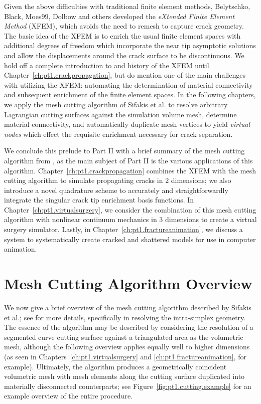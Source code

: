Given the above difficulties with traditional finite element methods, Belytschko, Black, Moes99, Dolbow \cite{Belytschko99, Moes99} and others developed the \emph{eXtended Finite Element Method} (XFEM), which avoids the need to remesh to capture crack geometry. The basic idea of the XFEM is to enrich the usual finite element spaces with additional degrees of freedom which incorporate the near tip asymptotic solutions and allow the displacements around the crack surface to be discontinuous. We hold off a complete introduction to and history of the XFEM until Chapter~\ref{ch:pt1.crackpropagation}, but do mention one of the main challenges with utilizing the XFEM: automating the determination of material connectivity and subsequent enrichment of the finite element spaces. In the following chapters, we apply the mesh cutting algorithm of Sifakis et al. \cite{Sifakis07} to resolve arbitrary Lagrangian cutting surfaces against the simulation volume mesh, determine material connectivity, and automatically duplicate mesh vertices to yield \emph{virtual nodes} which effect the requisite enrichment necessary for crack separation.

We conclude this prelude to Part II with a brief summary of the mesh cutting algorithm from \cite{Sifakis07}, as the main subject of Part II is the various applications of this algorithm. Chapter~\ref{ch:pt1.crackpropagation} combines the XFEM with the mesh cutting algorithm to simulate propagating cracks in $2$ dimensions; we also introduce a novel quadrature scheme to accurately and straightforwardly integrate the singular crack tip enrichment basis functions. In Chapter~\ref{ch:pt1.virtualsurgery}, we consider the combination of this mesh cutting algorithm with nonlinear continuum mechanics in $3$ dimensions to create a virtual surgery simulator. Lastly, in Chapter~\ref{ch:pt1.fractureanimation}, we discuss a system to systematically create cracked and shattered models for use in computer animation.

\section*{Mesh Cutting Algorithm Overview}

We now give a brief overview of the mesh cutting algorithm described by Sifakis et al.; see \cite{Sifakis07} for more details, specifically in resolving the intra-simplex geometry. The essence of the algorithm may be described by considering the resolution of a segmented curve cutting surface against a triangulated area as the volumetric mesh, although the following overview applies equally well to higher dimensions (as seen in Chapters~\ref{ch:pt1.virtualsurgery} and \ref{ch:pt1.fractureanimation}, for example). Ultimately, the algorithm produces a geometrically coincident volumetric mesh with mesh elements along the cutting surface duplicated into materially disconnected counterparts; see Figure~\ref{fig:pt1.cutting.example} for an example overview of the entire procedure.

